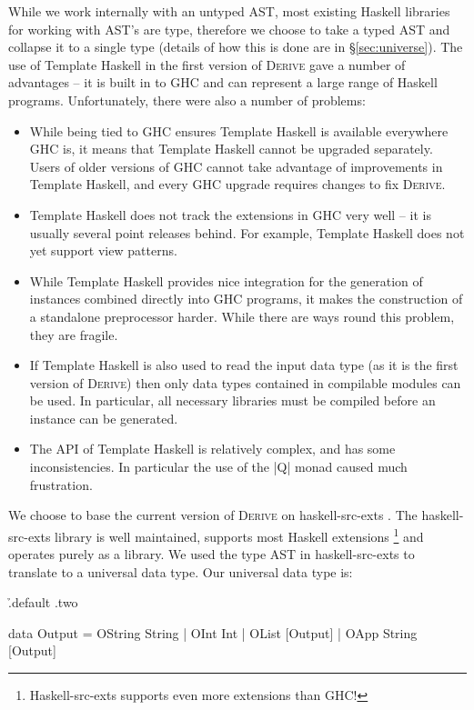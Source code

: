 \documentclass[preprint,draft]{sigplanconf}
\newcommand{\derive}{\textsc{Derive}}
\begin{document}
While we work internally with an untyped AST, most existing Haskell libraries for working with AST's are type, therefore we choose to take a typed AST and collapse it to a single type (details of how this is done are in \S\ref{sec:universe}). The use of Template Haskell in the first version of \derive{} gave a number of advantages -- it is built in to GHC and can represent a large range of Haskell programs. Unfortunately, there were also a number of problems:

\begin{itemize}
\item While being tied to GHC ensures Template Haskell is available everywhere GHC is, it means that Template Haskell cannot be upgraded separately. Users of older versions of GHC cannot take advantage of improvements in Template Haskell, and every GHC upgrade requires changes to fix \derive{}.
\item Template Haskell does not track the extensions in GHC very well -- it is usually several point releases behind. For example, Template Haskell does not yet support view patterns.
\item While Template Haskell provides nice integration for the generation of instances combined directly into GHC programs, it makes the construction of a standalone preprocessor harder. While there are ways round this problem, they are fragile.
\item If Template Haskell is also used to read the input data type (as it is the first version of \derive{}) then only data types contained in compilable modules can be used. In particular, all necessary libraries must be compiled before an instance can be generated.
\item The API of Template Haskell is relatively complex, and has some inconsistencies. In particular the use of the |Q| monad caused much frustration.
\end{itemize}

We choose to base the current version of \derive{} on haskell-src-exts \cite{haskell_src_exts}. The haskell-src-exts library is well maintained, supports most Haskell extensions \footnote{Haskell-src-exts supports even more extensions than GHC!} and operates purely as a library. We used the type AST in haskell-src-exts to translate to a universal data type. Our universal data type is:

\h{.default .two}\begin{code}
data Output  =  OString String
             |  OInt Int
             |  OList [Output]
             |  OApp String [Output]
\end{code}
\end{document}
